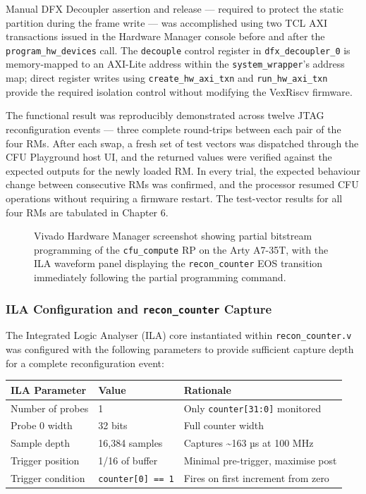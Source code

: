 Manual DFX Decoupler assertion and release — required to protect the static partition during the frame write — was accomplished using two TCL AXI transactions issued in the Hardware Manager console before and after the \texttt{program\_hw\_devices} call. The \texttt{decouple} control register in \texttt{dfx\_decoupler\_0} is memory-mapped to an AXI-Lite address within the \texttt{system\_wrapper}'s address map; direct register writes using \texttt{create\_hw\_axi\_txn} and \texttt{run\_hw\_axi\_txn} provide the required isolation control without modifying the VexRiscv firmware.

The functional result was reproducibly demonstrated across twelve JTAG reconfiguration events — three complete round-trips between each pair of the four RMs. After each swap, a fresh set of test vectors was dispatched through the CFU Playground host UI, and the returned values were verified against the expected outputs for the newly loaded RM. In every trial, the expected behaviour change between consecutive RMs was confirmed, and the processor resumed CFU operations without requiring a firmware restart. The test-vector results for all four RMs are tabulated in Chapter 6.

\begin{figure}[htbp]
\centering
{}
\caption{Vivado Hardware Manager screenshot showing partial bitstream programming of the \texttt{cfu\_compute} RP on the Arty A7-35T, with the ILA waveform panel displaying the \texttt{recon\_counter} EOS transition immediately following the partial programming command.}
\end{figure}

\subsubsection{ILA Configuration and \texttt{recon\_counter} Capture}

The Integrated Logic Analyser (ILA) core instantiated within \texttt{recon\_counter.v} was configured with the following parameters to provide sufficient capture depth for a complete reconfiguration event:

\begin{table}[htbp]
\centering
\begin{tabular}{lll}
\toprule
ILA Parameter & Value & Rationale \\
\midrule
Number of probes & 1 & Only \texttt{counter[31:0]} monitored \\
Probe 0 width & 32 bits & Full counter width \\
Sample depth & 16,384 samples & Captures \textasciitilde{}163 µs at 100 MHz \\
Trigger position & 1/16 of buffer & Minimal pre-trigger, maximise post \\
Trigger condition & \texttt{counter[0] == 1} & Fires on first increment from zero \\
\bottomrule
\end{tabular}
\end{table}

